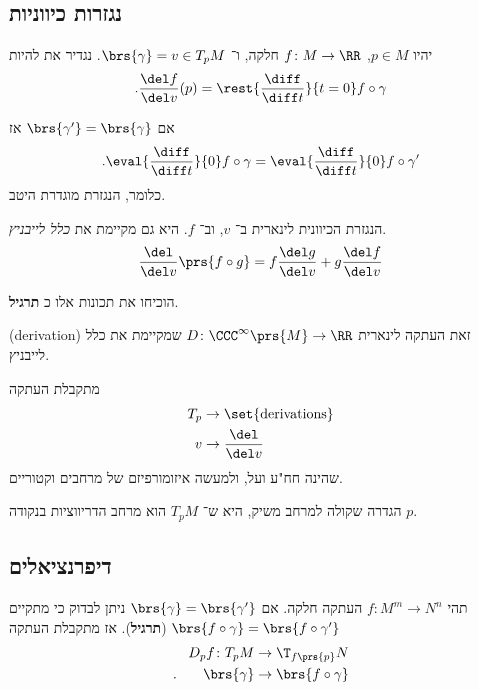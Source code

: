 \documentclass[a4paper,10pt,twoside,openany]{book}
\begin{document}
\subsection{נגזרות כיווניות}
יהיו
$p \in M$,
$f \colon M \to \RR$
חלקה,
ו־%
$\brs{\gamma} = v \in T_p M$.
נגדיר את
להיות
\begin{align*}
\text{.}\frac{\del f}{\del v}(p) = \rest{\frac{\diff}{\diff t}}{t=0} f \circ \gamma
\end{align*}

\begin{exercise}
אם
$\brs{\gamma'} = \brs{\gamma}$
אז
\begin{align*}
\text{.} \eval{\frac{\diff}{\diff t}}{0} f\circ \gamma = \eval{\frac{\diff}{\diff t}}{0} f\circ \gamma'
\end{align*}
כלומר, הנגזרת מוגדרת היטב.
\end{exercise}

הנגזרת הכיוונית לינארית ב־%
$v$,
וב־%
$f$.
היא גם מקיימת את
\emph{כלל לייבניץ}.
\begin{align*}
\frac{\del}{\del v} \prs{f \circ g} = f\frac{\del g}{\del v} + g\frac{\del f}{\del v}
\end{align*}

הוכיחו את תכונות אלו כ%
\textbf{תרגיל}.

\begin{definition}
\textenglish{(derivation)}
זאת העתקה לינארית
$D \colon \CCC^{\infty}\prs{M} \to \RR$
שמקיימת את כלל לייבניץ.
\end{definition}
\begin{remark}
מתקבלת העתקה
\begin{align*}
T_p &\to \set{\text{derivations}} \\
v &\to \frac{\del}{\del v}
\end{align*}
שהינה חח"ע ועל, ולמעשה איזומורפיזם של מרחבים וקטוריים.
\end{remark}
\begin{remark}
הגדרה שקולה למרחב משיק, היא ש־%
$T_p M$
הוא מרחב הדריווציות בנקודה
$p$.
\end{remark}
\subsection{דיפרנציאלים}
תהי
$f \colon M^m \to N^n$
העתקה חלקה. אם
$\brs{\gamma} = \brs{\gamma'}$
ניתן לבדוק כי מתקיים
$\brs{f\circ \gamma} = \brs{f\circ \gamma'}$
(\textbf{תרגיל}).
אז מתקבלת העתקה
\begin{align*}
D_p f \colon T_p M &\to \T_{f\prs{p}}N \\
\text{.} \phantom{D_p f} \brs{\gamma} &\to \brs{f\circ \gamma}
\end{align*}
\end{document}
